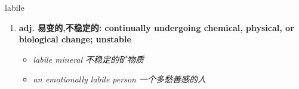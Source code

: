 
\begin{frame}
{\huge labile}
\begin{center}
\begin{enumerate}\Large
  \item \textbf{adj. 易变的,不稳定的: continually undergoing chemical, physical, or biological change; unstable}
  \begin{itemize}
    \item \em{\Large{labile mineral 不稳定的矿物质}}
    \item \em{\Large{an emotionally labile person 一个多愁善感的人}}
  \end{itemize}
\end{enumerate}
\end{center}
\end{frame}
